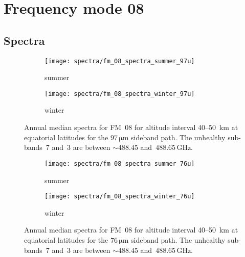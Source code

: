 \section{Frequency mode 08}
\label{FM08}

\subsection{Spectra}
\label{FM08:spectra}

\begin{figure}[ht]
    \centering
    \begin{subfigure}[b]{0.9545\textwidth}
        \texttt{[image: spectra/fm\_08\_spectra\_summer\_97u]}
        \caption{summer}\label{fig:spectra:08:summer:97u}
    \end{subfigure}
    \begin{subfigure}[b]{0.9545\textwidth}
        \texttt{[image: spectra/fm\_08\_spectra\_winter\_97u]}
        \caption{winter}\label{fig:spectra:08:winter:97u}
    \end{subfigure}
    \caption{Annual median spectra for FM~08 for altitude interval 40--50~km at
        equatorial latitudes for the $97\,\mathrm{\mu m}$ sideband path. The
        unhealthy sub-bands~7 and~3 are between $\sim488.45$
        and~$488.65\,\mathrm{GHz}$.
        }\label{fig:spectra:08:97u}
\end{figure}

\begin{figure}[ht]
    \centering
    \begin{subfigure}[b]{0.9545\textwidth}
        \texttt{[image: spectra/fm\_08\_spectra\_summer\_76u]}
        \caption{summer}\label{fig:spectra:08:summer:76u}
    \end{subfigure}
    \begin{subfigure}[b]{0.9545\textwidth}
        \texttt{[image: spectra/fm\_08\_spectra\_winter\_76u]}
        \caption{winter}\label{fig:spectra:08:winter:76u}
    \end{subfigure}
    \caption{Annual median spectra for FM~08 for altitude interval 40--50~km at
        equatorial latitudes for the $76\,\mathrm{\mu m}$ sideband path. The
        unhealthy sub-bands~7 and~3 are between $\sim488.45$
        and~$488.65\,\mathrm{GHz}$.
        }\label{fig:spectra:08:76u}
\end{figure}


